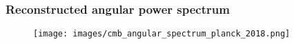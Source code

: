 \begin{frame}
\frametitle{Reconstructed angular power spectrum}

\begin{figure}
	\texttt{[image: images/cmb\_angular\_spectrum\_planck\_2018.png]}
\end{figure}

\end{frame}

